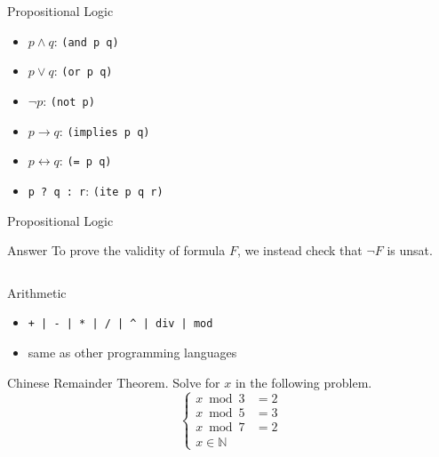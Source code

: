 \documentclass[10pt]{beamer}
\begin{document}
\begin{frame}{Propositional Logic}
  \begin{itemize}[<+->]
    \item $p \land q$: \texttt{(and p q)}
    \item $p \lor q$: \texttt{(or p q)}
    \item $\neg p$: \texttt{(not p)}
    \item $p \to q$: \texttt{(implies p q)}
    \item $p \leftrightarrow q$: \texttt{(= p q)}
    \item \texttt{p ? q : r}: \texttt{(ite p q r)}
  \end{itemize}
\end{frame}

\begin{frame}{Propositional Logic}
  \begin{alertblock}{Answer}
    \vspace{4pt}
    To prove the validity of formula $F$, we instead check that $\neg F$ is unsat.
    \inputminted{lisp}{./src/ex3.smt2}
  \end{alertblock}
\end{frame}

\begin{frame}{Arithmetic}
  \begin{itemize}
    \item \texttt{+ | - | * | / | \^{} | div | mod}
    \item same as other programming languages
  \end{itemize}
  \begin{example}
    \vspace{4pt}
    \alert{Chinese Remainder Theorem.} Solve for $x$ in the following problem.
    \begin{equation*}
      \begin{cases}
        x \bmod 3 &= 2\\
        x \bmod 5 &= 3\\
        x \bmod 7 &= 2\\
        x \in \mathbb{N}
      \end{cases}
    \end{equation*}
  \end{example}
\end{frame}
\end{document}

